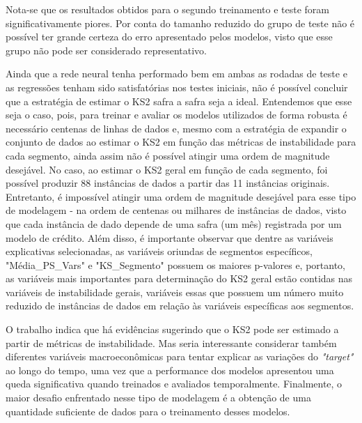 Nota-se que os resultados obtidos para o segundo treinamento e teste foram significativamente piores. Por conta do tamanho reduzido do grupo de teste não é possível ter grande certeza do erro apresentado pelos modelos, visto que esse grupo não pode ser considerado representativo.

Ainda que a rede neural tenha performado bem em ambas as rodadas de teste e as regressões tenham sido satisfatórias nos testes iniciais, não é possível concluir que a estratégia de estimar o KS2 safra a safra seja a  ideal. Entendemos que esse seja o caso, pois, para treinar e avaliar os modelos utilizados de forma robusta é necessário centenas de linhas de dados e, mesmo com a estratégia de expandir o conjunto de dados ao estimar o KS2 em função das métricas de instabilidade para cada segmento, ainda assim não é possível atingir uma ordem de magnitude desejável. No caso, ao estimar o KS2 geral em função de cada segmento, foi possível produzir 88 instâncias de dados a partir das 11 instâncias originais. Entretanto, é impossível atingir uma ordem de magnitude desejável para esse tipo de modelagem - na ordem de centenas ou milhares de instâncias de dados, visto que cada instância de dado depende de uma safra (um mês) registrada por um modelo de crédito. Além disso, é importante observar que dentre as variáveis explicativas selecionadas, as variáveis oriundas de segmentos específicos, "Média\_PS\_Vars" e "KS\_Segmento" possuem os maiores p-valores e, portanto, as variáveis mais importantes para determinação do KS2 geral estão contidas nas variáveis de instabilidade gerais, variáveis essas que possuem um número muito reduzido de instâncias de dados em relação às variáveis específicas aos segmentos.

O trabalho indica que há evidências sugerindo que o KS2 pode ser estimado a partir de métricas de instabilidade. Mas seria interessante considerar também diferentes variáveis macroeconômicas para tentar explicar as variações  do \emph{"target"} ao longo do tempo, uma vez que a performance dos modelos apresentou uma queda significativa quando treinados e avaliados temporalmente. Finalmente, o maior desafio enfrentado nesse tipo de modelagem é a obtenção de uma quantidade suficiente de dados para o treinamento desses modelos.




